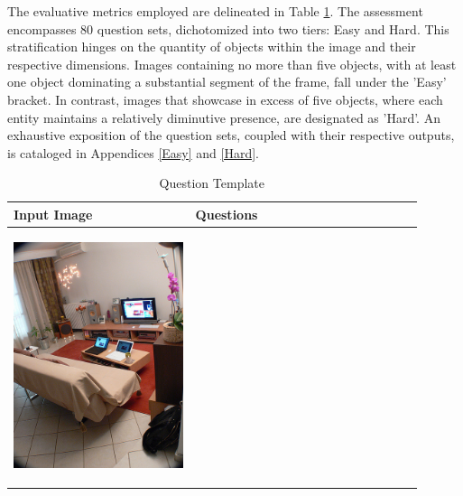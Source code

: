 \documentclass[journal,10pt]{IEEEtran}
\begin{document}
The evaluative metrics employed are delineated in Table \ref{tab:question_template}. The assessment encompasses 80 question sets, dichotomized into two tiers: Easy and Hard. This stratification hinges on the quantity of objects within the image and their respective dimensions. Images containing no more than five objects, with at least one object dominating a substantial segment of the frame, fall under the 'Easy' bracket. In contrast, images that showcase in excess of five objects, where each entity maintains a relatively diminutive presence, are designated as 'Hard'. An exhaustive exposition of the question sets, coupled with their respective outputs, is cataloged in Appendices \ref{Easy} and \ref{Hard}.
\begin{table}[ht]
    \centering
    \caption{Question Template}
    \label{tab:question_template}
    \begin{tabular}{|p{0.4\linewidth}|p{0.5\linewidth}|}
        \hline
        \textbf{Input Image} &\textbf{Questions}\\
        \hline
        \begin{center} \includegraphics[width=\linewidth]{../image set/hard/000000104739.jpg} \end{center}

\end{tabular}
\end{table}
\end{document}
